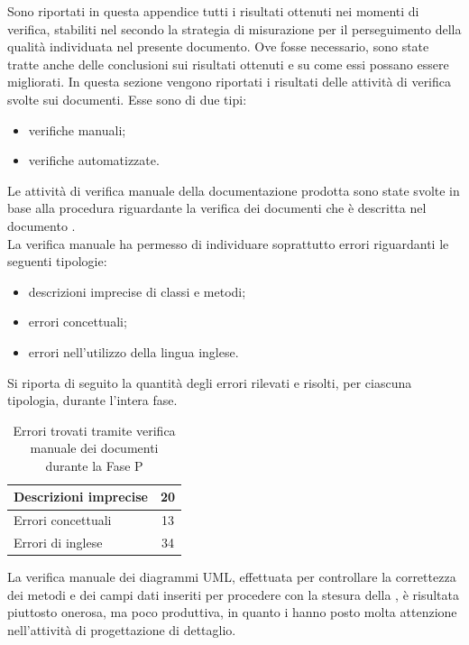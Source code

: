 	Sono riportati in questa appendice tutti i risultati ottenuti nei momenti di verifica, stabiliti nel  secondo la strategia di misurazione per il perseguimento della qualità individuata nel presente documento. Ove fosse necessario, sono state tratte anche delle conclusioni sui risultati ottenuti e su come essi possano essere migliorati.
			In questa sezione vengono riportati i risultati delle attività di verifica svolte sui documenti. Esse sono di due tipi:
			\begin{itemize}
				\item verifiche manuali;
				\item verifiche automatizzate.
			\end{itemize}
				Le attività di verifica manuale della documentazione prodotta sono state svolte in base alla procedura riguardante la verifica dei documenti che è descritta nel documento .\\
				La verifica manuale ha permesso di individuare soprattutto errori riguardanti le seguenti tipologie:
				\begin{itemize}
					\item descrizioni imprecise di classi e metodi;
					\item errori concettuali;
					\item errori nell'utilizzo della lingua inglese.
				\end{itemize}
				Si riporta di seguito la quantità degli errori rilevati e risolti, per ciascuna tipologia, durante l'intera fase.
				\begin{table}[H]
					\centering
						\begin{tabu}{| l | c |}
							\hline
								Descrizioni imprecise	&	20\\ \hline
								Errori concettuali	&	13\\ \hline
								Errori di inglese  &  34\\ \hline
						\end{tabu}
						\caption{Errori trovati tramite verifica manuale dei documenti durante la Fase P}
				\end{table}
				La verifica manuale dei diagrammi UML, effettuata per controllare la correttezza dei metodi e dei campi dati inseriti per procedere con la stesura della , è risultata piuttosto onerosa, ma poco produttiva, in quanto i  hanno posto molta attenzione nell'attività di progettazione di dettaglio.\\
